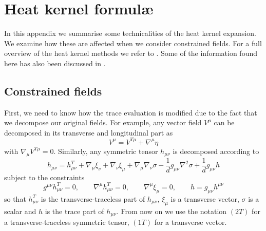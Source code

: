 \documentclass[notitlepage,eqsecnum,bm,amsmath,preprintnumbers,superscriptaddress,nofootinbib,aps,11pt]{revtex4-1}
\begin{document}
\section{\bf Heat kernel  formul\ae}
\label{app:HeatKernel}

In this appendix we summarise some technicalities of the heat kernel expansion. We examine how these are affected when we consider constrained fields. For a full overview of the heat kernel methods we refer to \cite{Avramidi:2000bm,Gilkey:1995mj}. Some of the information found here has also been discussed in \cite{Lauscher:2002sq,Codello:2008vh,Machado:2007ea}.


\subsection*{Constrained fields}
\label{sec:ConstrainedFields}

First, we need to know how the trace evaluation is modified due to the fact that we decompose our original fields. For example, any vector field $V^{\mu}$ can be decomposed in its transverse and longitudinal part as
\begin{equation}
V^{\mu}=V^{T\mu}+\nabla^{\mu}\eta\label{VectorDecomposition}
\end{equation}
with $\nabla_{\mu}V^{T\mu}=0$. Similarly, any symmetric tensor $h_{\mu\nu}$ is decomposed according to
\begin{equation}
h_{\mu\nu}=h^T_{\mu\nu}+\nabla_{\mu}\xi_{\nu}+\nabla_{\nu}\xi_{\mu}+\nabla_{\mu}\nabla_{\nu}\sigma-\frac{1}{d}g_{\mu\nu}\nabla^2\sigma+\frac{1}{d}g_{\mu\nu}h
\end{equation}
subject to the constraints 
\begin{equation}
g^{\mu\nu}h^T_{\mu\nu}=0, \qquad \nabla^{\mu}h^T_{\mu\nu}=0, \qquad \nabla^{\mu}\xi_{\mu}=0, \qquad h=g_{\mu\nu}h^{\mu\nu}
\end{equation}
so that $h^T_{\mu\nu}$ is the transverse-traceless part of $h_{\mu\nu}$, $\xi_{\mu}$ is a transverse vector, $\sigma$ is a scalar 
and $h$ is the trace part of $h_{\mu\nu}$. From now on we use the notation $(2T)$ for a transverse-traceless symmetric tensor, 
$(1T)$ for a transverse vector.
\end{document}
